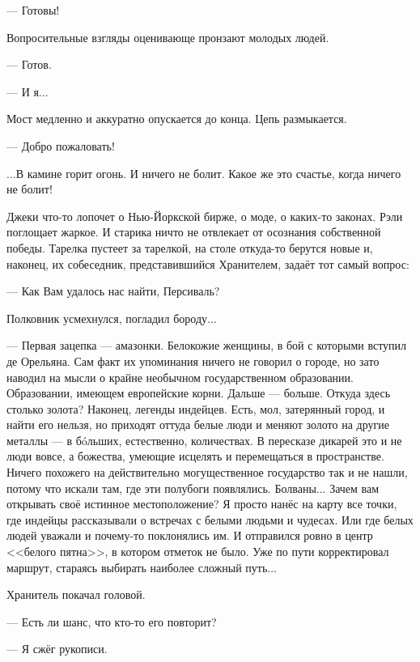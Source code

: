--- Готовы!

Вопросительные взгляды оценивающе пронзают молодых людей.

--- Готов.

--- И я...

Мост медленно и аккуратно опускается до конца. Цепь размыкается.

--- Добро пожаловать!

\emptypar

...В камине горит огонь. И ничего не болит. Какое же это счастье, когда ничего не болит!

Джеки что-то лопочет о Нью-Йоркской бирже, о моде, о каких-то законах. Рэли поглощает жаркое.
И старика ничто не отвлекает от осознания собственной победы.
Тарелка пустеет за тарелкой, на столе откуда-то берутся новые и, наконец, их собеседник, представившийся Хранителем,
задаёт тот самый вопрос:

--- Как Вам удалось нас найти, Персиваль?

Полковник усмехнулся, погладил бороду...

--- Первая зацепка --- амазонки. Белокожие женщины, в бой с которыми вступил де Орельяна.
Сам факт их упоминания ничего не говорил о городе, но зато наводил на мысли о крайне необычном государственном образовании.
Образовании, имеющем европейские корни.
Дальше --- больше. Откуда здесь столько золота?
Наконец, легенды индейцев. Есть, мол, затерянный город, и найти его нельзя,
но приходят оттуда белые люди и меняют золото на другие металлы --- в б\'oльших, естественно, количествах.
В пересказе дикарей это и не люди вовсе, а божества, умеющие исцелять и перемещаться в пространстве.
Ничего похожего на действительно могущественное государство так и не нашли, потому что искали там, где эти полубоги появлялись.
Болваны... Зачем вам открывать своё истинное местоположение?
Я просто нанёс на карту все точки, где индейцы рассказывали о встречах с белыми людьми и чудесах.
Или где белых людей уважали и почему-то поклонялись им.
И отправился ровно в центр <<белого пятна>>, в котором отметок не было.
Уже по пути корректировал маршрут, стараясь выбирать наиболее сложный путь...

Хранитель покачал головой.

--- Есть ли шанс, что кто-то его повторит?

--- Я сжёг рукописи.



